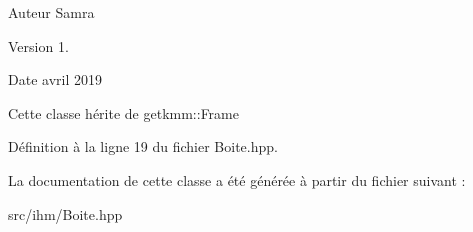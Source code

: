 \begin{DoxyAuthor}{Auteur}
Samra 
\end{DoxyAuthor}
\begin{DoxyVersion}{Version}
1. 
\end{DoxyVersion}
\begin{DoxyDate}{Date}
avril 2019
\end{DoxyDate}
Cette classe hérite de getkmm\+::\+Frame 

Définition à la ligne 19 du fichier Boite.\+hpp.



La documentation de cette classe a été générée à partir du fichier suivant \+:\begin{DoxyCompactItemize}
\item 
src/ihm/Boite.\+hpp\end{DoxyCompactItemize}
